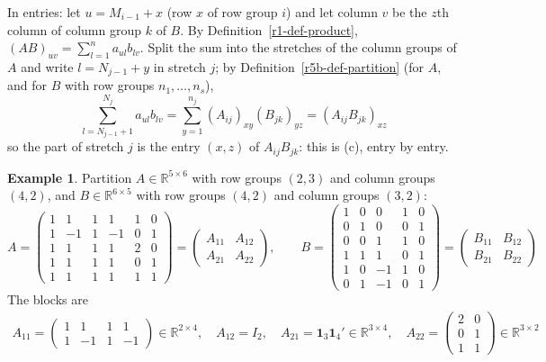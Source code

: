 \documentclass[12pt]{article}
\newcommand{\R}{\mathbb R}
\newcommand{\one}{\mathbf 1}
\theoremstyle{definition}
\newtheorem{example}[theorem]{Example}
\begin{document}
In entries: let \(u=M_{i-1}+x\) (row \(x\) of row group \(i\)) and let column \(v\) be the \(z\)th column of
column group \(k\) of \(B\). By Definition~\ref{r1-def-product}, \((AB)_{uv}=\sum_{l=1}^na_{ul}b_{lv}\). Split the
sum into the stretches of the column groups of \(A\) and write \(l=N_{j-1}+y\) in stretch \(j\); by
Definition~\ref{r5b-def-partition} (for \(A\), and for \(B\) with row groups \(n_1,\dots,n_s\)),
\[
\sum_{l=N_{j-1}+1}^{N_j}a_{ul}b_{lv}=\sum_{y=1}^{n_j}(A_{ij})_{xy}(B_{jk})_{yz}=(A_{ij}B_{jk})_{xz}
\]
so the part of stretch \(j\) is the entry \((x,z)\) of \(A_{ij}B_{jk}\): this is (c), entry by entry.

\begin{example}\label{r5b-exm-block}
Partition \(A\in\R^{5\times6}\) with row groups \((2,3)\) and column groups \((4,2)\), and
\(B\in\R^{6\times5}\) with row groups \((4,2)\) and column groups \((3,2)\):
\[
A=\left(\begin{array}{cccc|cc}1&1&1&1&1&0\\1&-1&1&-1&0&1\\\hline1&1&1&1&2&0\\1&1&1&1&0&1\\1&1&1&1&1&1\end{array}\right)
=\begin{pmatrix}A_{11}&A_{12}\\A_{21}&A_{22}\end{pmatrix},\qquad
B=\left(\begin{array}{ccc|cc}1&0&0&1&0\\0&1&0&0&1\\0&0&1&1&0\\1&1&1&0&1\\\hline1&0&-1&1&0\\0&1&-1&0&1\end{array}\right)
=\begin{pmatrix}B_{11}&B_{12}\\B_{21}&B_{22}\end{pmatrix}
\]
The blocks are
\[
\begin{gathered}
A_{11}=\begin{pmatrix}1&1&1&1\\1&-1&1&-1\end{pmatrix}\in\R^{2\times4},\quad A_{12}=I_2,\quad
A_{21}=\one_3\one_4'\in\R^{3\times4},\quad A_{22}=\begin{pmatrix}2&0\\0&1\\1&1\end{pmatrix}\in\R^{3\times2}\\

\end{gathered}\]
\end{example}
\end{document}
